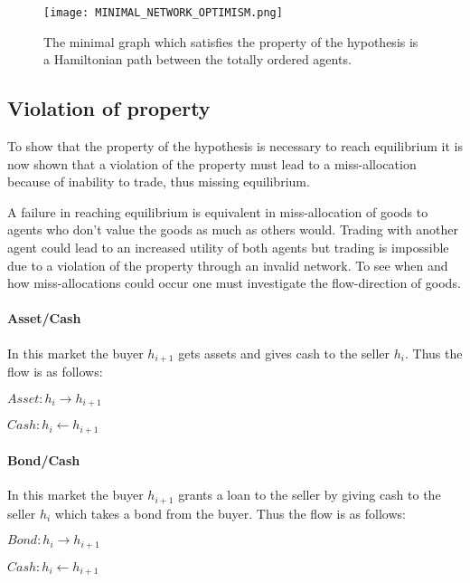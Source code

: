 \documentclass[Bachelorarbeit.tex]{subfiles}
\begin{document}
\begin{figure}[H]
	\centering
  \texttt{[image: MINIMAL\_NETWORK\_OPTIMISM.png]}
  	\caption{The minimal graph which satisfies the property of the hypothesis is a Hamiltonian path between the totally ordered agents.}
	\label{fig:MINIMAL_NETWORK_OPTIMISM}
\end{figure}

\subsection{Violation of property}
To show that the property of the hypothesis is necessary to reach equilibrium it is now shown that a violation of the property must lead to a miss-allocation because of inability to trade, thus missing equilibrium.

\medskip

A failure in reaching equilibrium is equivalent in miss-allocation of goods to agents who don't value the goods as much as others would. Trading with another agent could lead to an increased utility of both agents but trading is impossible due to a violation of the property through an invalid network. To see when and how miss-allocations could occur one must investigate the flow-direction of goods.

\paragraph{Asset/Cash} In this market the buyer $h_{i+1}$ gets assets and gives cash to the seller $h_i$. Thus the flow is as follows:
\begin{center}
$Asset: h_i \to h_{i+1}$
\end{center}
\begin{center}
$Cash: h_i \gets h_{i+1}$
\end{center}

\paragraph{Bond/Cash} In this market the buyer $h_{i+1}$ grants a loan to the seller by giving cash to the seller $h_i$ which takes a bond from the buyer. Thus the flow is as follows:
\begin{center}
$Bond: h_i \to h_{i+1}$
\end{center}
\begin{center}
$Cash: h_i \gets h_{i+1}$
\end{center}
\end{document}
